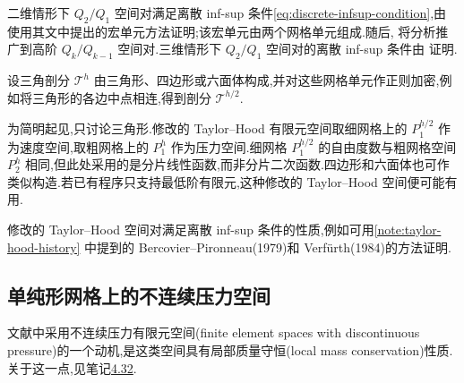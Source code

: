 \begin{note}[$Q_k/Q_{k-1}$($k\ge2$)空间对]\label{note:qk-qkminus1-stability}
二维情形下 $Q_2/Q_1$ 空间对满足离散 inf-sup 条件\cref{eq:discrete-infsup-condition},由\textcite{Stenberg1984} 使用其文中提出的宏单元方法证明;该宏单元由两个网格单元组成.随后,\textcite{Stenberg1990} 将分析推广到高阶 $Q_k/Q_{k-1}$ 空间对.三维情形下 $Q_2/Q_1$ 空间对的离散 inf-sup 条件由\textcite{Stenberg1987} 证明.
\end{note}

\begin{note}\label{note:modified-taylor-hood}
设三角剖分 $\mathcal{T}^h$ 由三角形、四边形或六面体构成,并对这些网格单元作正则加密,例如将三角形的各边中点相连,得到剖分 $\mathcal{T}^{h/2}$.

为简明起见,只讨论三角形.修改的 Taylor--Hood 有限元空间取细网格上的 $P_1^{h/2}$ 作为速度空间,取粗网格上的 $P_1^h$ 作为压力空间.细网格 $P_1^{h/2}$ 的自由度数与粗网格空间 $P_2^h$ 相同,但此处采用的是分片线性函数,而非分片二次函数.四边形和六面体也可作类似构造.若已有程序只支持最低阶有限元,这种修改的 Taylor--Hood 空间便可能有用.

修改的 Taylor--Hood 空间对满足离散 inf-sup 条件的性质,例如可用\cref{note:taylor-hood-history} 中提到的 Bercovier--Pironneau(1979)和 Verfürth(1984)的方法证明.
\end{note}

\subsection{单纯形网格上的不连续压力空间}\label{sec:scott-vogelius}

\begin{note}[动机]\label{note:discontinuous-pressure-motivation}
文献中采用不连续压力有限元空间(finite element spaces with discontinuous pressure)的一个动机,是这类空间具有局部质量守恒(local mass conservation)性质.关于这一点,见笔记\hyperref[note:stokes-local-mass-conservation-discontinuous-pressure]{4.32}.
\end{note}

